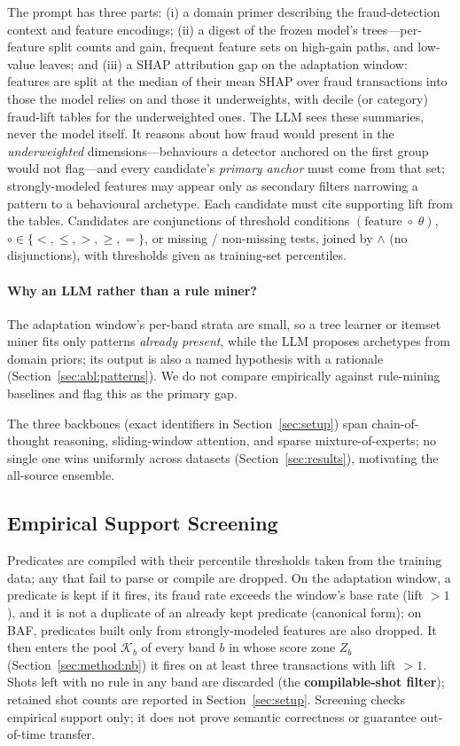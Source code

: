\documentclass[11pt]{article}
\begin{document}
The prompt has three parts: (i) a domain primer describing the fraud-detection context and feature
encodings; (ii) a digest of the frozen model's trees---per-feature split counts and gain, frequent
feature sets on high-gain paths, and low-value leaves; and (iii) a SHAP attribution gap on the
adaptation window: features are split at the median of their mean SHAP over fraud transactions into
those the model relies on and those it underweights, with decile (or category) fraud-lift tables for
the underweighted ones. The LLM sees these summaries, never the model itself. It reasons about how
fraud would present in the \emph{underweighted} dimensions---behaviours a detector anchored on the
first group would not flag---and every candidate's \emph{primary anchor} must come from that set;
strongly-modeled features may appear only as secondary filters narrowing a pattern to a behavioural
archetype. Each candidate must cite supporting lift from the tables. Candidates are conjunctions of
threshold conditions $(\text{feature}\;\circ\;\theta)$, $\circ\in\{<,\le,>,\ge,=\}$, or missing /
non-missing tests, joined by $\wedge$ (no disjunctions), with thresholds given as training-set
percentiles.

\paragraph{Why an LLM rather than a rule miner?}
The adaptation window's per-band strata are small, so a tree learner or itemset miner fits only
patterns \emph{already present}, while the LLM proposes archetypes from domain priors; its output is
also a named hypothesis with a rationale (Section~\ref{sec:abl:patterns}). We do not compare
empirically against rule-mining baselines and flag this as the primary gap.

The three backbones (exact identifiers in Section~\ref{sec:setup}) span chain-of-thought reasoning,
sliding-window attention, and sparse mixture-of-experts; no single one wins uniformly across
datasets (Section~\ref{sec:results}), motivating the all-source ensemble.

\subsection{Empirical Support Screening}
\label{sec:method:screen}

Predicates are compiled with their percentile thresholds taken from the training data; any that fail
to parse or compile are dropped. On the adaptation window, a predicate is kept if it fires, its fraud
rate exceeds the window's base rate (lift $>1$), and it is not a duplicate of an already kept
predicate (canonical form); on BAF, predicates built only from strongly-modeled features are also
dropped. It then enters the pool $\mathcal{K}_b$ of every band $b$ in whose score
zone $Z_b$ (Section~\ref{sec:method:nb}) it fires on at least three transactions with lift $>1$.
Shots left with no rule in any band are discarded (the \textbf{compilable-shot filter}); retained
shot counts are reported in Section~\ref{sec:setup}. Screening checks empirical support only; it does
not prove semantic correctness or guarantee out-of-time transfer.
\end{document}
